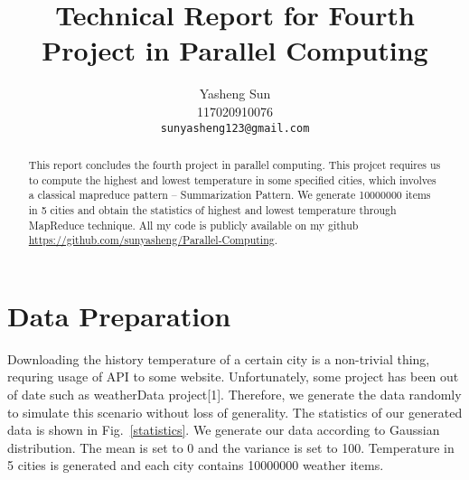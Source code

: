 \documentclass[10pt,twocolumn,letterpaper]{article}
\begin{document}
    
    \title{Technical Report for Fourth Project in Parallel Computing}
    
    \author{Yasheng Sun\\
    117020910076\\
    {\tt\small sunyasheng123@gmail.com}
    }
    
    \maketitle
    
    \begin{abstract}
       This report concludes the fourth project in parallel computing. This projcet requires
       us to compute the highest and lowest temperature in some specified cities, which involves
       a classical mapreduce pattern -- Summarization Pattern. We generate 10000000 items in 5
       cities and obtain the statistics of highest and lowest temperature through MapReduce technique. 
       All my code is publicly available on my github
        \url{https://github.com/sunyasheng/Parallel-Computing}.

    \end{abstract}
    
    
    
    \section{Data Preparation}
    
    Downloading the history temperature of a certain city is a non-trivial thing, requring usage
    of API to some website. Unfortunately, some project has been out of date such as weatherData project[1].
    Therefore, we generate the data randomly to simulate this scenario without loss of generality.
    The statistics of our generated data is shown in Fig.~\ref{statistics}. We generate our data according to Gaussian
    distribution. The mean is set to 0 and the variance is set to 100. Temperature in 5 cities 
    is generated and each city contains 10000000 weather items. 
\end{document}
